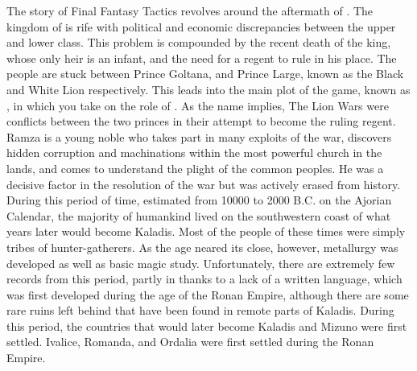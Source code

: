 %
The story of Final Fantasy Tactics revolves around the aftermath of . 
The kingdom of  is rife with political and economic discrepancies between the upper and lower class. 
This problem is compounded by the recent death of the king, whose only heir is an infant, and the need for a regent to rule in his place. 
The people are stuck between Prince Goltana, and Prince Large, known as the Black and White Lion respectively.
This leads into the main plot of the game, known as , in which you take on the role of . 
As the name implies, The Lion Wars were conflicts between the two princes in their attempt to become the ruling regent. 
Ramza is a young noble who takes part in many exploits of the war, discovers hidden corruption and machinations within the most powerful church in the lands, and comes to understand the plight of the common peoples. 
He was a decisive factor in the resolution of the war but was actively erased from history.
%
%
%
\clearpage
%
%
\\
During this period of time, estimated from 10000 to 2000 B.C. on the Ajorian Calendar, the majority of humankind lived on the southwestern coast of what years later would become Kaladis. 
Most of the people of these times were simply tribes of hunter-gatherers. 
As the age neared its close, however, metallurgy was developed as well as basic magic study. 
Unfortunately, there are extremely few records from this period, partly in thanks to a lack of a written language, which was first developed during the age of the Ronan Empire, although there are some rare ruins left behind that have been found in remote parts of Kaladis.
During this period, the countries that would later become Kaladis and Mizuno were first settled. Ivalice, Romanda, and Ordalia were first settled during the Ronan Empire.
%
\ofpar
